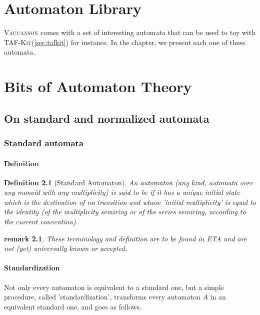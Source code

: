\documentclass[a4paper]{report}
\newtheorem{definition} [theorem]{Definition}
\newtheorem{remark}     [theorem]{remark}
\newcommand{\Index}[1]{\index{#1}#1}
\newcommand{\tafkit}{\textsc{TAF-Kit}\xspace}
\newcommand{\Vauc}{\textsc{Vaucanson}\xspace}
\begin{document}
\appendix

\chapter{Automaton Library}

\Vauc comes with a set of interesting automata that can be used to toy
with \tafkit (\autoref{sec:tafkit}) for instance.  In the chapter, we
present each one of these automata.

\chapter{Bits of Automaton Theory}
\label{sec:theory}

\section{On standard and normalized automata}

\subsection{Standard automata}

\subsubsection{Definition}

\begin{definition}[\Index{Standard Automaton}]
  An automaton (any kind, automata over any monoid with any
  multiplicity) is said to be  if it has a unique
  initial state which is the destination of no transition and whose
  'initial multiplicity' is equal to the identity (of the multiplicity
  semiring or of the series semiring, according to the current
  convention).
\end{definition}

\begin{remark}
  These terminology and definition are to be found in ETA and are not
  (yet) universally known or accepted.
\end{remark}

\subsubsection{Standardization}

Not only every automaton is equivalent to a standard one, but a simple
procedure, called 'standardization', transforms every automaton $A$ in
an equivalent standard one, and goes as follows.
\end{document}
